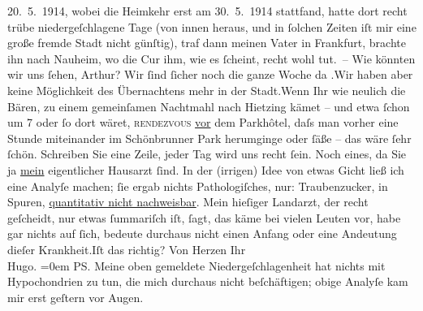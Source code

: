 \begin{ledgroupsized}[t]{13cm}
{{{                     20. 5. 1914, wobei die Heimkehr erst am 30. 5. 1914
                  stattfand}}}\label{K_L02182-2h}, hatte dort recht trübe niedergeſchlagene Tage (von innen heraus,
               und in ſolchen Zeiten iſt mir eine große fremde Stadt nicht günſtig), traf dann
               meinen Vater in Frankfurt, brachte ihn nach Nauheim, wo die Cur ihm, wie es ſcheint, recht wohl tut. – Wie
                  {\pb}könnten wir uns ſehen, Arthur?
               Wir ſind ſicher noch die ganze Woche da \label{K_L02182-3v}\label{K_L02182-3h}.\hspace*{1.5em}Wir haben aber keine Möglichkeit des Übernachtens mehr
               in der Stadt.\hspace*{1.5em}Wenn Ihr wie neulich die Bären, zu einem gemeinſamen Nachtmahl
               nach Hietzing kämet – und etwa ſchon um
                  7 oder ſo dort wäret, \textsc{rendezvous}{ }\uline{vor} dem Parkhôtel, daſs man {\pb}vorher
               eine Stunde miteinander im Schönbrunner Park
               herumginge oder ſäße – das wäre ſehr ſchön. Schreiben Sie eine Zeile, jeder Tag wird
               uns recht ſein.\pend
           \pstart
           Noch eines, da Sie ja \uline{mein} eigentlicher Hausarzt
               ſind. In der (irrigen) Idee von etwas Gicht ließ ich eine Analyſe machen; ſie ergab
               nichts Pathologiſches, nur: Traubenzucker,  in
               Spuren, {\pb}\uline{quantitativ nicht nachweisbar}. Mein hieſiger Landarzt, der recht
               geſcheidt, nur etwas ſummariſch iſt, ſagt, das käme bei vielen Leuten vor, habe gar
               nichts auf ſich, bedeute durchaus nicht einen Anfang oder eine Andeutung dieſer
                  Krankheit.\hspace*{1.5em}Iſt das richtig?\pend
           \pstart
           Von Herzen Ihr{\\[\baselineskip]}\spacefill\mbox{Hugo.}\pend
           \leftskip=0em{}\pstart
           \noindent{}\textsc{PS}. Meine oben gemeldete Niedergeſchlagenheit hat nichts
                  mit Hypochondrien zu tun, die mich durchaus nicht beſchäftigen; obige Analyſe kam
                  mir erst geſtern vor Augen.\pend
           

\end{ledgroupsized}
